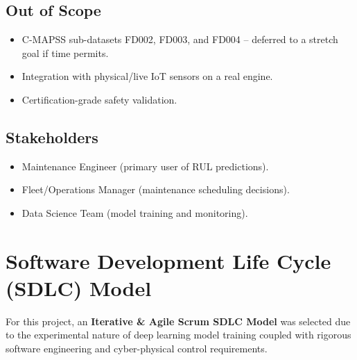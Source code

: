 \documentclass[12pt,a4paper]{report}
\begin{document}
\subsection*{Out of Scope}
\begin{itemize}
    \item C-MAPSS sub-datasets FD002, FD003, and FD004 -- deferred to a stretch goal if time permits.
    \item Integration with physical/live IoT sensors on a real engine.
    \item Certification-grade safety validation.
\end{itemize}
 
\subsection*{Stakeholders}
\begin{itemize}
    \item Maintenance Engineer (primary user of RUL predictions).
    \item Fleet/Operations Manager (maintenance scheduling decisions).
    \item Data Science Team (model training and monitoring).
\end{itemize}

\section{Software Development Life Cycle (SDLC) Model}

For this project, an \textbf{Iterative \& Agile Scrum SDLC Model} was selected due to the experimental nature of deep learning model training coupled with rigorous software engineering and cyber-physical control requirements.
\end{document}
